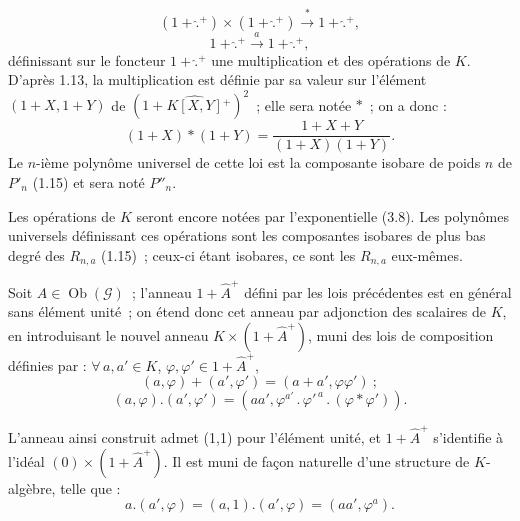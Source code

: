 
\[
  (1+\widehat{\mathord{.}}{}^{+})\times(1+\widehat{\mathord{.}}{}^{+})\xrightarrow{\ \ast\ }1+\widehat{\mathord{.}}{}^{+},
\]
\[
  1+\widehat{\mathord{.}}{}^{+}\xrightarrow{\ a\ }1+\widehat{\mathord{.}}{}^{+},
\]
définissant sur le foncteur \(1+\widehat{\mathord{.}}{}^{+}\) une multiplication et des opérations de \(K\). D'après 1.13, la multiplication est définie par sa valeur sur l'élément \((1+X,1+Y)\) de \((1+\widehat{K[X,Y]}{}^{+})^{2}\)~; elle sera notée \(\ast\)~; on a donc :
\begin{equation}\tag{6.1.1}
  (1+X)\ast(1+Y)=\frac{1+X+Y}{(1+X)(1+Y)}.
\end{equation}
Le \(n\)-ième polynôme universel de cette loi est la composante isobare de poids \(n\) de \(P'_n\) (1.15) et sera noté \(P''_n\).

Les opérations de \(K\) seront encore notées par l'exponentielle (3.8). Les polynômes universels définissant ces opérations sont les composantes isobares de plus bas degré des \(R_{n,a}\) (1.15)~; ceux-ci étant isobares, ce sont les \(R_{n,a}\) eux-mêmes.

Soit \(A\in\operatorname{Ob}(\mathcal G)\)~; l'anneau \(1+\widehat A^{+}\) défini par les lois précédentes est en général sans élément unité~; on étend donc cet anneau par adjonction des scalaires de \(K\), en introduisant le nouvel anneau \(K\times(1+\widehat A^{+})\), muni des lois de composition définies par : \(\forall\,a,a'\in K\), \(\varphi,\varphi'\in1+\widehat A^{+}\),
\[
  (a,\varphi)+(a',\varphi')=(a+a',\varphi\varphi')~;
\]
\begin{equation}\tag{6.1.2}
  (a,\varphi).(a',\varphi')=(aa',\varphi^{a'}\mathbin{.}{\varphi'}^{\,a}\mathbin{.}(\varphi\ast\varphi')).
\end{equation}

L'anneau ainsi construit admet (1,1) pour l'élément unité, et \(1+\widehat A^{+}\) s'identifie à l'idéal \((0)\times(1+\widehat A^{+})\). Il est muni de façon naturelle d'une structure de \(K\)-algèbre, telle que :
\begin{equation}\tag{6.1.3}
  a.(a',\varphi)=(a,1).(a',\varphi)=(aa',\varphi^{a}).
\end{equation}

